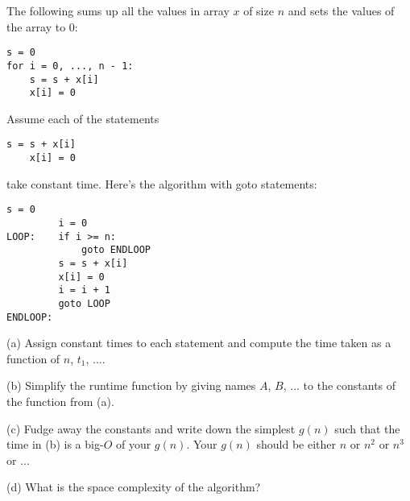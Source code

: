 The following  sums up all the values in array $x$ of size $n$ and sets
the values of the array to 0:
\begin{Verbatim}[frame=single, fontsize=\small]
s = 0
for i = 0, ..., n - 1:
    s = s + x[i]
    x[i] = 0
\end{Verbatim}
Assume each of the statements
\begin{Verbatim}[frame=single, fontsize=\small]
    s = s + x[i]
    x[i] = 0
\end{Verbatim}
take constant time.
Here's the algorithm with goto statements:
\begin{Verbatim}[frame=single, fontsize=\small]
         s = 0
         i = 0 
LOOP:    if i >= n:         
             goto ENDLOOP          
         s = s + x[i]
         x[i] = 0
         i = i + 1          
         goto LOOP
ENDLOOP:
\end{Verbatim}
(a) Assign constant times to each statement and 
compute the time taken as a function of $n$, $t_1$, ....

(b) Simplify the runtime function by giving names $A$, $B$, ...
to the constants of the function from (a).

(c) Fudge away the constants and write down the simplest $g(n)$ such 
that the time in (b) is a big-$O$ of your $g(n)$.
Your $g(n)$ should be either $n$ or $n^2$ or $n^3$ or ...

(d) What is the space complexity of the algorithm?
